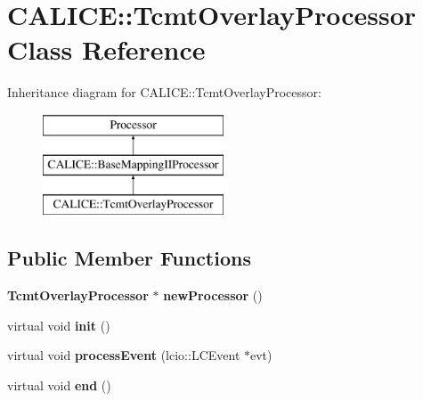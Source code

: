 \section{C\-A\-L\-I\-C\-E\-:\-:Tcmt\-Overlay\-Processor Class Reference}
\label{classCALICE_1_1TcmtOverlayProcessor}
Inheritance diagram for C\-A\-L\-I\-C\-E\-:\-:Tcmt\-Overlay\-Processor\-:\begin{figure}[H]
\begin{center}
\leavevmode
\includegraphics[height=3.000000cm]{classCALICE_1_1TcmtOverlayProcessor}
\end{center}
\end{figure}
\subsection*{Public Member Functions}
\begin{DoxyCompactItemize}
\item 
{\bf Tcmt\-Overlay\-Processor} $\ast$ {\bfseries new\-Processor} ()\label{classCALICE_1_1TcmtOverlayProcessor_a491ee74bd3a2849b4c5e590e78c5966e}

\item 
virtual void {\bfseries init} ()\label{classCALICE_1_1TcmtOverlayProcessor_a47c6fb10b94cdd75b6b2568f97163e57}

\item 
virtual void {\bfseries process\-Event} (lcio\-::\-L\-C\-Event $\ast$evt)\label{classCALICE_1_1TcmtOverlayProcessor_a10fe01954775475de24e7b0827bd83d7}

\item 
virtual void {\bfseries end} ()\label{classCALICE_1_1TcmtOverlayProcessor_a58abd4dd600627ba59982ad1458f795b}

\end{DoxyCompactItemize}
